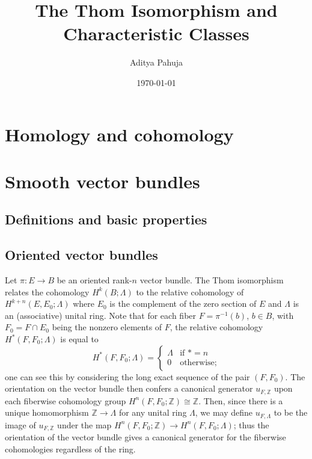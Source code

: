 \documentclass[10pt]{article}
\title{\vspace{-2.0cm}The Thom Isomorphism and Characteristic Classes}
\author{\large Aditya Pahuja}
\date{\large \today}
\providecommand{\ZZ}{\mathbb Z}
\providecommand{\inv}{^{-1}}
\begin{document}
\maketitle
\tableofcontents
\pagebreak

\section{Homology and cohomology}

\section{Smooth vector bundles}

\subsection{Definitions and basic properties}

\subsection{Oriented vector bundles}


Let $\pi\colon E\to B$ be an oriented rank-$n$ vector bundle.
The Thom isomorphism relates the cohomology
$H^k(B;\Lambda)$ to the relative cohomology of $H^{k+n}(E,E_0; \Lambda)$
where $E_0$ is the complement of the zero section of $E$
and $\Lambda$ is an (associative) unital ring.
Note that for each fiber $F = \pi\inv(b)$, $b\in B$,
with $F_0 = F\cap E_0$ being the nonzero elements of $F$,
the relative cohomology $H^*(F,F_0; \Lambda)$ is equal to
\begin{equation*}
    H^*(F,F_0; \Lambda) = \begin{cases}
	\Lambda & \text{if }* = n\\
	0 & \text{otherwise;}
    \end{cases}
\end{equation*}
one can see this by considering the long exact sequence of the pair $(F,F_0)$.
The orientation on the vector bundle then confers a
canonical generator $u_{F,\ZZ}$ upon each
fiberwise cohomology group $H^n(F,F_0;\ZZ)\cong\ZZ$.
Then, since there is a unique homomorphism $\ZZ\to\Lambda$
for any unital ring $\Lambda$, we may define $u_{F,\Lambda}$
to be the image of $u_{F,\ZZ}$ under the map
$H^n(F,F_0;\ZZ)\to H^n(F,F_0;\Lambda)$;
thus the orientation of the vector bundle gives a canonical generator
for the fiberwise cohomologies regardless of the ring.

\end{document}
